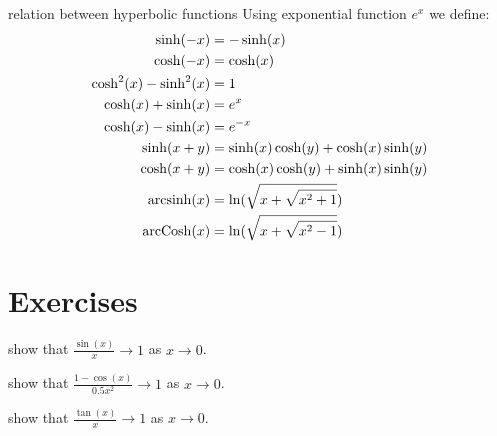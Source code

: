 \documentclass{article}
\begin{document}
\begin{myleftlinebox}
	relation between hyperbolic functions
	\tcblower
	Using exponential function $e^x$ we define:
	\begin{align*}
		\sinh(-x) &= -\sinh(x)\\
		\cosh(-x) &= \cosh(x)\\
		\cosh^2(x) -\sinh^2(x) &= 1\\
		\cosh(x)+\sinh(x)&=e^x\\
		\cosh(x)-\sinh(x)&=e^{-x}\\
		\sinh(x+y) &=\sinh(x)\cosh(y)+\cosh(x)\sinh(y)\\
		\cosh(x+y) &=\cosh(x)\cosh(y)+\sinh(x)\sinh(y)\\
		\operatorname{arcsinh}(x)&=\ln(\sqrt{x+\sqrt{x^2+1}})\\
		\operatorname{arcCosh}(x)&=\ln(\sqrt{x+\sqrt{x^2-1}})\\
	\end{align*}
\end{myleftlinebox}

\section{Exercises}

\begin{myleftlinebox}
	show that $\frac{\sin(x)}{x}\to 1$ as $x\to 0$.
	\tcblower
	\vspace{2em}
\end{myleftlinebox}

\begin{myleftlinebox}
	show that $\frac{1-\cos(x)}{0.5x^2}\to 1$ as $x\to 0$.
	\tcblower
	\vspace{2em}
\end{myleftlinebox}

\begin{myleftlinebox}
	show that $\frac{\tan(x)}{x}\to 1$ as $x\to 0$.
	\tcblower
	\vspace{2em}
\end{myleftlinebox}
\end{document}
